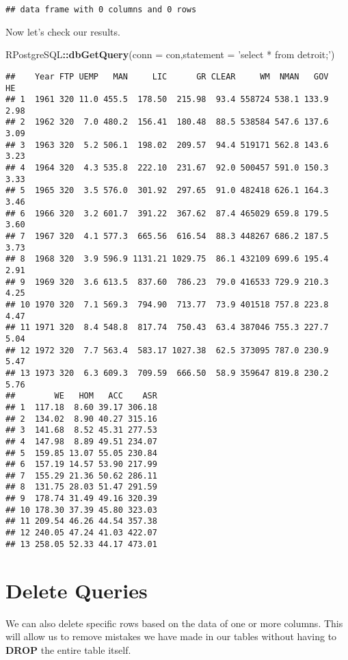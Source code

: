 \documentclass[]{book}
\newenvironment{Shaded}{\begin{snugshade}}{\end{snugshade}}
\newcommand{\KeywordTok}[1]{\textcolor[rgb]{0.13,0.29,0.53}{\textbf{#1}}}
\newcommand{\DataTypeTok}[1]{\textcolor[rgb]{0.13,0.29,0.53}{#1}}
\newcommand{\StringTok}[1]{\textcolor[rgb]{0.31,0.60,0.02}{#1}}
\newcommand{\OperatorTok}[1]{\textcolor[rgb]{0.81,0.36,0.00}{\textbf{#1}}}
\newcommand{\NormalTok}[1]{#1}
\begin{document}
\begin{verbatim}
## data frame with 0 columns and 0 rows
\end{verbatim}

Now let's check our results.

\begin{Shaded}
\begin{Highlighting}[]
\NormalTok{RPostgreSQL}\OperatorTok{::}\KeywordTok{dbGetQuery}\NormalTok{(}\DataTypeTok{conn =}\NormalTok{ con,}\DataTypeTok{statement =} \StringTok{'select * from detroit;'}\NormalTok{)}
\end{Highlighting}
\end{Shaded}

\begin{verbatim}
##    Year FTP UEMP   MAN     LIC      GR CLEAR     WM  NMAN   GOV   HE
## 1  1961 320 11.0 455.5  178.50  215.98  93.4 558724 538.1 133.9 2.98
## 2  1962 320  7.0 480.2  156.41  180.48  88.5 538584 547.6 137.6 3.09
## 3  1963 320  5.2 506.1  198.02  209.57  94.4 519171 562.8 143.6 3.23
## 4  1964 320  4.3 535.8  222.10  231.67  92.0 500457 591.0 150.3 3.33
## 5  1965 320  3.5 576.0  301.92  297.65  91.0 482418 626.1 164.3 3.46
## 6  1966 320  3.2 601.7  391.22  367.62  87.4 465029 659.8 179.5 3.60
## 7  1967 320  4.1 577.3  665.56  616.54  88.3 448267 686.2 187.5 3.73
## 8  1968 320  3.9 596.9 1131.21 1029.75  86.1 432109 699.6 195.4 2.91
## 9  1969 320  3.6 613.5  837.60  786.23  79.0 416533 729.9 210.3 4.25
## 10 1970 320  7.1 569.3  794.90  713.77  73.9 401518 757.8 223.8 4.47
## 11 1971 320  8.4 548.8  817.74  750.43  63.4 387046 755.3 227.7 5.04
## 12 1972 320  7.7 563.4  583.17 1027.38  62.5 373095 787.0 230.9 5.47
## 13 1973 320  6.3 609.3  709.59  666.50  58.9 359647 819.8 230.2 5.76
##        WE   HOM   ACC    ASR
## 1  117.18  8.60 39.17 306.18
## 2  134.02  8.90 40.27 315.16
## 3  141.68  8.52 45.31 277.53
## 4  147.98  8.89 49.51 234.07
## 5  159.85 13.07 55.05 230.84
## 6  157.19 14.57 53.90 217.99
## 7  155.29 21.36 50.62 286.11
## 8  131.75 28.03 51.47 291.59
## 9  178.74 31.49 49.16 320.39
## 10 178.30 37.39 45.80 323.03
## 11 209.54 46.26 44.54 357.38
## 12 240.05 47.24 41.03 422.07
## 13 258.05 52.33 44.17 473.01
\end{verbatim}

\section{Delete Queries}\label{delete-queries}

We can also delete specific rows based on the data of one or more
columns. This will allow us to remove mistakes we have made in our
tables without having to \textbf{DROP} the entire table itself.
\end{document}
